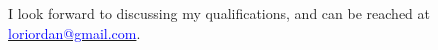 \documentclass[10pt,a4paper,unicode]{moderncv}
\begin{document}
%
I look forward to discussing my qualifications, and can be reached at \href{loriordan@gmail.com}{\textcolor{blue}{loriordan@gmail.com}}.
\end{document}
